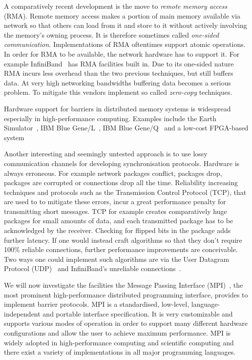\documentclass[a4paper, 10pt]{article}
\begin{document}
A comparatively recent development is the move to \emph{remote memory access} (RMA). Remote memory access makes a portion of main memory available via network so that others can load from it and store to it without actively involving the memory's owning process. It is therefore sometimes called \emph{one-sided communication}. Implementations of RMA oftentimes support atomic operations.
In order for RMA to be available, the network hardware has to support it. For example InfiniBand~\cite{infiniband} has RMA facilities built in.
Due to its one-sided nature RMA incurs less overhead than the two previous techniques, but still buffers data. At very high networking bandwidths buffering data becomes a serious problem. To mitigate this vendors implement so called \emph{zero-copy} techniques.

Hardware support for barriers in distributed memory systems is widespread especially in high-performance computing. Examples include the Earth Simulator~\cite{earthsimulator}, IBM Blue Gene/L~\cite{bluegenel}, IBM Blue Gene/Q~\cite{bluegeneq} and a low-cost FPGA-based system~\cite{hoefler2006b}

Another interesting and seemingly untested approach is to use lossy communication channels for developing synchronisation protocols. Hardware is always erroneous. For example network packages conflict, packages drop, packages are corrupted or connections drop all the time. Reliability increasing techniques and protocols such as the Transmission Control Protocol (TCP), that are used to to mitigate these errors, incur a great performance penalty for transmitting short messages. TCP for example creates comparatively huge packages for small amounts of data, and each transmitted package has to be acknowledged by the receiver. Checking for flipped bits in the package adds further latency.
If one would instead craft algorithms so that they don't require 100\% reliable connections, further performance improvements are conceivable.
Two ways one could implement such algorithms are via the User Datagram Protocol (UDP)~\cite{udp} and InfiniBand's unreliable connections~\cite{infiniband}.

We will now investigate the facilities the Message Passing Interface (MPI)~\cite{mpi3}, the most prominent high-performance distributed programming interface, provides to implement barrier protocols. MPI is a standardised, low-level, language-independent and portable interface specification. It is very customizable and supports various modes of operation in order to support many different hardware configurations and allow the user to achieve maximum performance. MPI is widely adopted in high-performance computing and scientific computing\cite{mpiadoptiona, mpiadoptionb, mpiadoptionc} and there exist a variety of implementations in all major programming languages.
\end{document}
